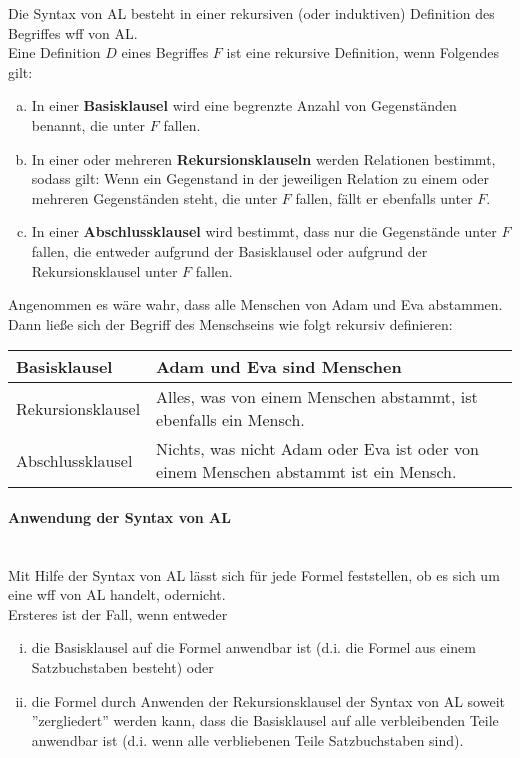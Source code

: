 \documentclass{scrartcl}
\begin{document}
Die Syntax von AL besteht in einer rekursiven (oder induktiven) Definition des Begriffes wff von AL. \\

Eine Definition $ D $ eines Begriffes $ F $ ist eine rekursive Definition, wenn Folgendes gilt:
\begin{enumerate}[(a)]
	\item In einer \textbf{Basisklausel} wird eine begrenzte Anzahl von Gegenständen benannt, die unter $ F $ fallen.
	\item In einer oder mehreren \textbf{Rekursionsklauseln} werden Relationen bestimmt, sodass gilt: Wenn ein Gegenstand in der jeweiligen Relation zu einem oder mehreren Gegenständen steht, die unter $ F $ fallen, fällt er ebenfalls unter $ F $.
	\item In einer \textbf{Abschlussklausel} wird bestimmt, dass nur die Gegenstände unter $ F $ fallen, die entweder aufgrund der Basisklausel oder aufgrund der Rekursionsklausel unter $ F $ fallen.
\end{enumerate}

Angenommen es wäre wahr, dass alle Menschen von Adam und Eva abstammen. Dann ließe sich der Begriff des Menschseins wie folgt rekursiv definieren: \\

\renewcommand{\arraystretch}{1.5}
\begin{tabularx}{\linewidth}{l X}
	Basisklausel & Adam und Eva sind Menschen \\
	\hline
	Rekursionsklausel & Alles, was von einem Menschen abstammt, ist ebenfalls ein Mensch. \\
	\hline
	Abschlussklausel & Nichts, was nicht Adam oder Eva ist oder von einem Menschen abstammt ist ein Mensch.
\end{tabularx} 

\paragraph{Anwendung der Syntax von AL} \mbox{}\\

Mit Hilfe der Syntax von AL lässt sich für jede Formel feststellen, ob es sich um eine wff von AL handelt, odernicht. \\

Ersteres ist der Fall, wenn entweder
\begin{enumerate}[(i)]
	\item die Basisklausel auf die Formel anwendbar ist (d.i. die Formel aus einem Satzbuchstaben besteht) oder
	\item die Formel durch Anwenden der Rekursionsklausel der Syntax von AL soweit ''zergliedert'' werden kann, dass die Basisklausel auf alle verbleibenden Teile anwendbar ist (d.i. wenn alle verbliebenen Teile Satzbuchstaben sind).
\end{enumerate}
\end{document}
